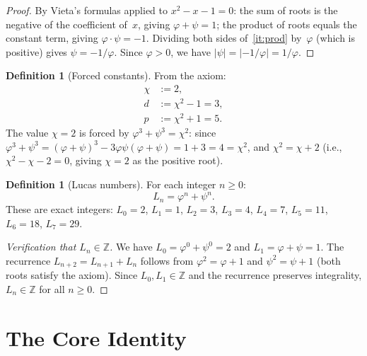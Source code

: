 \documentclass[12pt, a4paper]{article}
\theoremstyle{plain}
\theoremstyle{definition}
\newtheorem{definition}[theorem]{Definition}
\theoremstyle{remark}
\newcommand{\Z}{\mathbb{Z}}
\newcommand{\vp}{\varphi}
\begin{document}
\begin{proof}
  By Vieta's formulas applied to $x^2 - x - 1 = 0$:
  the sum of roots is the negative of the coefficient of~$x$,
  giving $\vp + \psi = 1$;
  the product of roots equals the constant term,
  giving $\vp \cdot \psi = -1$.
  Dividing both sides of~\ref{it:prod} by~$\vp$ (which is positive)
  gives $\psi = -1/\vp$.
  Since $\vp > 0$, we have $|\psi| = |{-1/\vp}| = 1/\vp$.
\end{proof}

\begin{definition}[Forced constants]\label{def:forced}
  From the axiom:
  \begin{align}
    \chi &:= 2, \label{eq:chi} \\
    d &:= \chi^2 - 1 = 3, \label{eq:d} \\
    p &:= \chi^2 + 1 = 5. \label{eq:p}
  \end{align}
  The value $\chi = 2$ is forced by $\vp^3 + \psi^3 = \chi^2$:
  since $\vp^3 + \psi^3 = (\vp + \psi)^3 - 3\vp\psi(\vp + \psi)
  = 1 + 3 = 4 = \chi^2$, and $\chi^2 = \chi + 2$ (i.e.,
  $\chi^2 - \chi - 2 = 0$, giving $\chi = 2$ as the positive root).
\end{definition}

\begin{definition}[Lucas numbers]\label{def:lucas}
  For each integer $n \geq 0$:
  \begin{equation}\label{eq:lucas}
    L_n = \vp^n + \psi^n.
  \end{equation}
  These are exact integers: $L_0 = 2$, $L_1 = 1$, $L_2 = 3$,
  $L_3 = 4$, $L_4 = 7$, $L_5 = 11$, $L_6 = 18$, $L_7 = 29$.
\end{definition}

\begin{proof}[Verification that $L_n \in \Z$]
  We have $L_0 = \vp^0 + \psi^0 = 2$ and
  $L_1 = \vp + \psi = 1$.  The recurrence $L_{n+2} = L_{n+1} + L_n$
  follows from $\vp^2 = \vp + 1$ and $\psi^2 = \psi + 1$
  (both roots satisfy the axiom).  Since $L_0, L_1 \in \Z$ and the
  recurrence preserves integrality, $L_n \in \Z$ for all $n \geq 0$.
\end{proof}

\section{The Core Identity}\label{sec:core}
\end{document}
